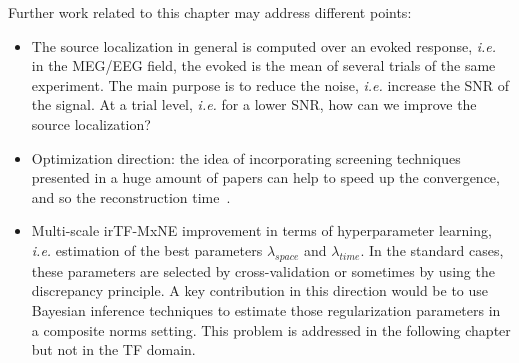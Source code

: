 Further work related to this chapter may address different points:
\begin{itemize}
    \item The source localization in general is computed over an evoked response, \textit{i.e.} in the MEG/EEG field, the evoked is the mean of several trials of the same experiment. The main purpose is to reduce the noise, \textit{i.e.} increase the SNR of the signal. At a trial level, \textit{i.e.} for a lower SNR, how can we improve the source localization?

    \item Optimization direction: the idea of incorporating screening techniques presented in a huge amount of papers can help to speed up the convergence, and so the reconstruction time~\cite{massias2017safe,massiasgap,fercoq-etal:2015,Ndiaye_Fercoq_Gramfort_Salmon15,ndiaye2016gap,ndiaye2017efficient}.

    \item Multi-scale irTF-MxNE improvement in terms of hyperparameter learning, \textit{i.e.} estimation of the best parameters $\lambda_{space}$ and $\lambda_{time}$. In the standard cases, these parameters are selected by cross-validation or sometimes by using the discrepancy principle. A key contribution in this direction would be to use Bayesian inference techniques to estimate those regularization parameters in a composite norms setting. This problem is addressed in the following chapter but not in the TF domain.
\end{itemize}

